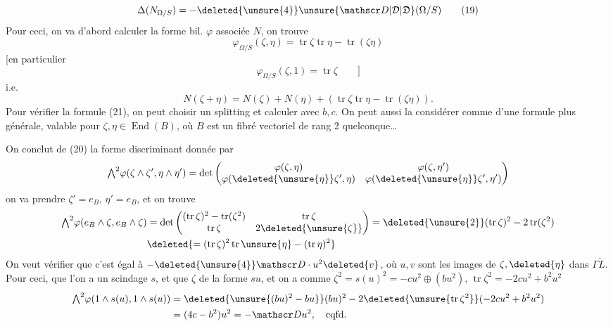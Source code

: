 \[
\Delta(N_{\Omega/S})=-\deleted{\unsure{4}}\unsure{\mathscr D|\mathcal D|\mathfrak D}(\Omega/S) \tag*{(19)}
\]
Pour ceci, on va d'abord calculer la forme bil.
$\varphi$ associée  $N$, on trouve
\[
\varphi_{\Omega/S}(\zeta,\eta)=\operatorname{tr}\zeta\operatorname{tr}\eta-\operatorname{tr}(\zeta\eta) \tag*{(20)}
\]
[en particulier
\[
\varphi_{\Omega/S}(\zeta,1)=\operatorname{tr}\zeta\qquad ] \tag*{(21)}
\]
i.e.
\[
N(\zeta+\eta)=N(\zeta)+N(\eta)+(\operatorname{tr}\zeta\operatorname{tr}\eta-\operatorname{tr}(\zeta\eta)).\tag*{(22)}
\]
Pour vérifier la formule (21), on peut choisir un
splitting et calculer avec $b,c$. On peut aussi
la considérer comme  d'une formule plus
générale, valable pour $\zeta,\eta\in\operatorname{End}(B)$, où $B$
est un fibré vectoriel de rang 2 quelconque\ldots

On conclut de (20)  la forme discriminant
 donnée par
\[
{\textstyle\bigwedge^2}\varphi(\zeta\wedge\zeta',\eta\wedge\eta')=\det
\begin{pmatrix}\varphi(\zeta,\eta)&\varphi(\zeta,\eta')\\
\varphi(\deleted{\unsure{\eta}}\zeta',\eta)&\varphi(\deleted{\unsure{\eta}}\zeta',\eta')\end{pmatrix}
\]
on va prendre $\zeta'=e_B$, $\eta'=e_B$, \inserted{$\zeta=\eta$} et on trouve
\[
\begin{aligned}
{\textstyle\bigwedge^2}\varphi( e_B\wedge\zeta,e_B\wedge\zeta)
 &=\det\begin{pmatrix}(\operatorname{tr}\zeta)^2-\operatorname{tr}(\zeta^2)&\operatorname{tr}\zeta\\
 \operatorname{tr}\zeta&2\deleted{\unsure{\zeta}}\end{pmatrix}
 =\deleted{\unsure{2}}(\operatorname{tr}\zeta)^2-2\operatorname{tr}(\zeta^2)\\
 &\deleted{=(\operatorname{tr}\zeta)^2\operatorname{tr}\unsure{\eta}-(\operatorname{tr}\eta)^2}
\end{aligned}
\]
On veut vérifier que \unsure{$-$} c'est égal à $-\deleted{\unsure{4}}\mathscr D\cdot u^2\deleted{v}$, où
$u,v$ sont les images de $\zeta,\deleted{\eta}$ dans $\Gamma\check L$. Pour ceci,
 que l'on a un scindage $s$, et que
$\zeta$   de la forme $su$,  et on a
 comme $\zeta^2=s(u)^2=-cu^2\oplus(bu^2)$, $\operatorname{tr}\zeta^2=-2cu^2+b^2u^2$
\[
\begin{aligned}
{\textstyle\bigwedge^2}\varphi(1\wedge s(u),1\wedge s(u))&=\deleted{\unsure{(bu)^2-bu}}(bu)^2-2\deleted{\unsure{\operatorname{tr}\zeta^2}}(-2cu^2+b^2u^2)\\
&=(4c-b^2)u^2=-\mathscr D u^2,\quad \text{cqfd.}
\end{aligned}
\]


